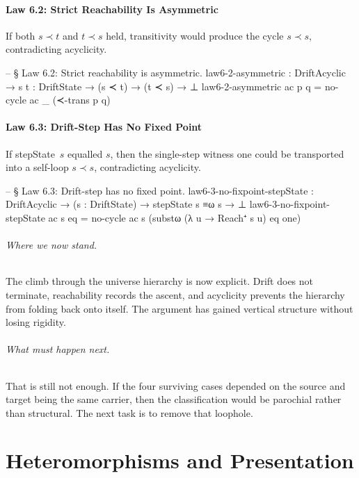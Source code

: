 \documentclass[11pt,a4paper]{book}
\def\texttt#1{#1}%
\begin{document}
\subsection{Law 6.2: Strict Reachability Is Asymmetric}

If both $s \prec t$ and $t \prec s$ held, transitivity would produce the cycle $s \prec s$, contradicting acyclicity.

\begin{code}
-- § Law 6.2: Strict reachability is asymmetric.
law6-2-asymmetric :
  DriftAcyclic → {s t : DriftState} →
  (s ≺ t) → (t ≺ s) → ⊥
law6-2-asymmetric ac p q = no-cycle ac _ (≺-trans p q)
\end{code}

\subsection{Law 6.3: Drift-Step Has No Fixed Point}

If \texttt{stepState}~$s$ equalled $s$, then the single-step witness \texttt{one} could be transported into a self-loop $s \prec s$, contradicting acyclicity.

\begin{code}
-- § Law 6.3: Drift-step has no fixed point.
law6-3-no-fixpoint-stepState : DriftAcyclic → (s : DriftState) → stepState s ≡ω s → ⊥
law6-3-no-fixpoint-stepState ac s eq =
  no-cycle ac s (substω (λ u → Reach⁺ s u) eq one)
\end{code}

\paragraph{Where we now stand.}
The climb through the universe hierarchy is now explicit. Drift does not terminate, reachability records the ascent, and acyclicity prevents the hierarchy from folding back onto itself. The argument has gained vertical structure without losing rigidity.

\paragraph{What must happen next.}
That is still not enough. If the four surviving cases depended on the source and target being the same carrier, then the classification would be parochial rather than structural. The next task is to remove that loophole.

\part{Heteromorphisms and Presentation}
\end{document}

